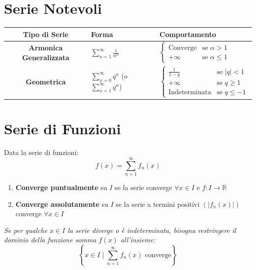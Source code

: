 \documentclass[10pt, a4paper]{article}
\begin{document}
\section{Serie Notevoli}
    \begin{center}
        \begin{tabular}{|c|p{6cm}|p{5cm}|}
            \hline
            \textbf{Tipo di Serie} & \textbf{Forma} & \textbf{Comportamento} \\
            \hline
            \textbf{Armonica Generalizzata} & $\displaystyle \sum_{n=1}^{\infty}\frac{1}{n^\alpha}$ & 
                $\begin{cases}
                    \text{Converge} & \text{se }\alpha > 1 \\
                    +\infty & \text{se }\alpha \leq 1
                \end{cases}$ \\
            \hline
            \textbf{Geometrica} & $\displaystyle \sum_{n=0}^{\infty}q^n$ (o $\sum_{n=1}^{\infty}q^n$) & 
                $\begin{cases}
                    \frac{1}{1-q} & \text{se } |q|< 1 \\
                    +\infty & \text{se } q \geq 1 \\
                    \text{Indeterminata} & \text{se } q \leq -1
                \end{cases}$ \\
            \hline
        \end{tabular}
    \end{center}
\section{Serie di Funzioni}
    Data la serie di funzioni:
    \begin{equation*}
        f(x) = \sum_{n=1}^{\infty}f_n(x)
    \end{equation*}
    \begin{enumerate}
        \item \textbf{Converge puntualmente} su $I$ se la serie converge $\forall x\in I$ e $f:I\rightarrow\mathbb{R}$
        \item \textbf{Converge assolutamente} su $I$ se la serie a termini positivi $\left(\left|f_n(x)\right|\right)$ converge $\forall x\in I$
    \end{enumerate}
    \textit{Se per qualche $x\in I$ la serie diverge o è indeterminata, bisogna restringere il dominio della funzione somma $f(x)$ all'insieme:} \begin{equation*}
        \left\{x\in I \mid \sum_{n=1}^{\infty}f_n(x) \text{ converge}\right\}
    \end{equation*}
\end{document}
